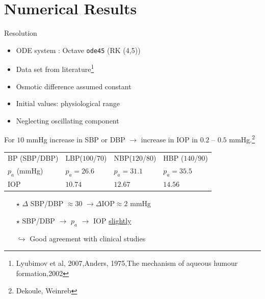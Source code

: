 \section{Numerical Results}
\frame{\sectionpage}
\begin{frame}{Resolution}
\begin{itemize}
\item ODE system : Octave \texttt{ode45} (RK (4,5))
\item Data set from literature\footnote{Lyubimov et al, 2007,Anders, 1975,The mechanism of aqueous humour formation,2002}
\item Osmotic difference assumed constant
\item Initial values: physiological range
\item Neglecting oscillating component
\end{itemize}

\end{frame}
\begin{frame}

\end{frame}
\begin{frame}
\alert{For $10$ mmHg increase in SBP or DBP $\rightarrow$ increase in IOP in $0.2$ -- $0.5$ mmHg.}\footnote{Dekoule, Weinreb}
\bigskip


\begin{tabular}{|l|l|l|l|}
\hline
BP (SBP/DBP)& LBP($100$/$70$)&NBP($120$/$80$) & HBP ($140$/$90$)\\
$p_a$ (mmHg)& $p_a = 26.6$ & $p_a = 31.1$ & $p_a = 35.5$\\
\hline
IOP & $10.74$ & $12.67$ & $14.56$\\
\hline
\end{tabular}
\bigskip
\begin{itemize}
\item[$\star$] $\Delta$ SBP/DBP $\approx 30$ $\rightarrow \Delta$IOP$\approx 2$ mmHg\\

\item[$\star$]SBP/DBP $\rightarrow$ $p_a$ $\rightarrow$ IOP \underline{slightly}\\

\item[$\hookrightarrow$] Good agreement with clinical studies
\end{itemize}

\end{frame}
